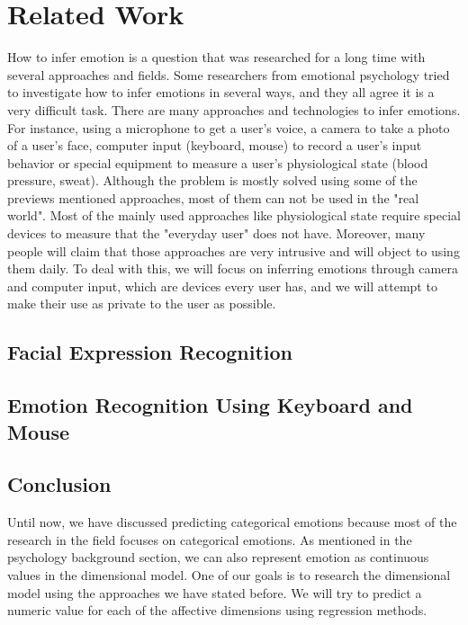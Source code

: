 \documentclass{article}
\begin{document}
\section{Related Work}
How to infer emotion is a question that was researched for a long time with several approaches and fields.
Some researchers from emotional psychology tried to investigate how to infer emotions in several ways, and they all agree
it is a very difficult task. There are many approaches and technologies to infer emotions.
For instance, using a microphone to get a user’s voice, a camera to take a photo of a user’s face, computer input (keyboard, mouse) to record a user’s
input behavior or special equipment to measure a user’s physiological state (blood pressure, sweat).
Although the problem is mostly solved using some of the previews mentioned approaches, most of them can not be used in the "real world".
Most of the mainly used approaches like physiological state require special devices to measure that the "everyday user" does not have.
Moreover, many people will claim that those approaches are very intrusive and will object to using them daily.
To deal with this, we will focus on inferring emotions through camera and computer input, which are devices every user has,
and we will attempt to make their use as private to the user as possible.

\subsection{Facial Expression Recognition} \label{section:fer}


\subsection{Emotion Recognition Using Keyboard and Mouse} \label{section:keyboard_mouse}


\subsection{Conclusion}

Until now, we have discussed predicting categorical emotions because most of the research in the 
field focuses on categorical emotions. As mentioned in the psychology background section, 
we can also represent emotion as continuous values in the dimensional model. 
One of our goals is to research the dimensional model using the approaches we have stated before. 
We will try to predict a numeric value for each of the affective dimensions using 
regression methods.
\par
\end{document}
